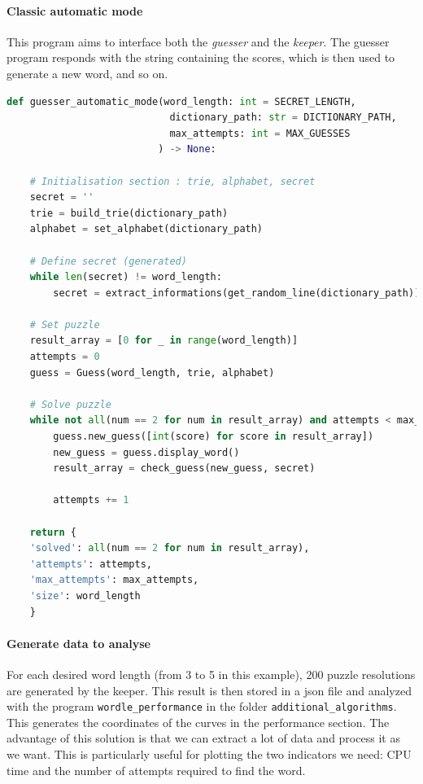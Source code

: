 \documentclass[10pt,a4paper,hidelinks]{article}
\begin{document}
\paragraph{Classic automatic mode}
This program aims to interface both the \textit{guesser} and the \textit{keeper}. The guesser program responds with the string containing the scores, which is then used to generate a new word, and so on.
\begin{lstlisting}[language=Python]
def guesser_automatic_mode(word_length: int = SECRET_LENGTH,
                            dictionary_path: str = DICTIONARY_PATH,
                            max_attempts: int = MAX_GUESSES
                          ) -> None:

    # Initialisation section : trie, alphabet, secret
    secret = ''
    trie = build_trie(dictionary_path)
    alphabet = set_alphabet(dictionary_path)

    # Define secret (generated)
    while len(secret) != word_length:
        secret = extract_informations(get_random_line(dictionary_path))

    # Set puzzle
    result_array = [0 for _ in range(word_length)]
    attempts = 0
    guess = Guess(word_length, trie, alphabet)

    # Solve puzzle
    while not all(num == 2 for num in result_array) and attempts < max_attempts:
        guess.new_guess([int(score) for score in result_array])
        new_guess = guess.display_word()
        result_array = check_guess(new_guess, secret)

        attempts += 1

    return {
    'solved': all(num == 2 for num in result_array),
    'attempts': attempts,
    'max_attempts': max_attempts,
    'size': word_length
    }

\end{lstlisting}

\paragraph{Generate data to analyse}
For each desired word length (from 3 to 5 in this example), 200 puzzle resolutions are generated by the keeper. This result is then stored in a json file and analyzed with the program \verb|wordle_performance| in the folder \verb|additional_algorithms|. This generates the coordinates of the curves in the performance section. 
The advantage of this solution is that we can extract a lot of data and process it as we want. This is particularly useful for plotting the two indicators we need: CPU time and the number of attempts required to find the word.
\end{document}
